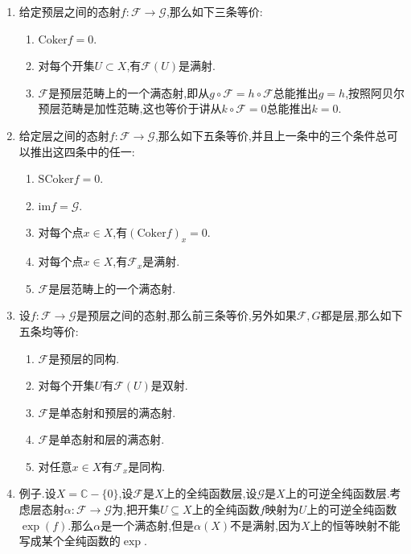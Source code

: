 \begin{enumerate}
\begin{enumerate}[(a)]
\begin{enumerate}[(1)]
\begin{proof}
				对可分预层$\mathscr{F}$验证(d)推(b):假设$s\in \mathscr{F}(U)$满足$\mathscr{F}(U)(s)=0\in\mathscr{G}(U)$.那么对每个$x\in U$有$\mathscr{F}_x(s_x)=(\mathscr{F}(U)(s))_x=0$,按照条件$\mathscr{F}_x$是单射,得到$s_x=0,\forall x\in U$,于是唯一性公理得到$s=0$.
			\end{proof}
			\item 给定预层之间的态射$f:\mathscr{F}\to\mathscr{G}$,那么如下三条等价:
			\begin{enumerate}[(1)]
				\item $\mathrm{Coker}f=0$.
				\item 对每个开集$U\subset X$,有$\mathscr{F}(U)$是满射.
				\item $\mathscr{F}$是预层范畴上的一个满态射,即从$g\circ \mathscr{F}=h\circ \mathscr{F}$总能推出$g=h$,按照阿贝尔预层范畴是加性范畴,这也等价于讲从$k\circ \mathscr{F}=0$总能推出$k=0$.
			\end{enumerate}
			\item 给定层之间的态射$f:\mathscr{F}\to\mathscr{G}$,那么如下五条等价,并且上一条中的三个条件总可以推出这四条中的任一:
			\begin{enumerate}[(1)]
				\item $\mathrm{SCoker}f=0$.
				\item $\mathrm{im}f=\mathscr{G}$.
				\item 对每个点$x\in X$,有$(\mathrm{Coker}f)_x=0$.
				\item 对每个点$x\in X$,有$\mathscr{F}_x$是满射.
				\item $\mathscr{F}$是层范畴上的一个满态射.
			\end{enumerate} 
			\item 设$f:\mathscr{F}\to\mathscr{G}$是预层之间的态射,那么前三条等价,另外如果$\mathscr{F},G$都是层,那么如下五条均等价:
			\begin{enumerate}[(1)]
				\item $\mathscr{F}$是预层的同构.
				\item 对每个开集$U$有$\mathscr{F}(U)$是双射.
				\item $\mathscr{F}$是单态射和预层的满态射.
				\item $\mathscr{F}$是单态射和层的满态射.
				\item 对任意$x\in X$有$\mathscr{F}_x$是同构.
			\end{enumerate}
			\item 例子.设$X=\mathbb{C}-\{0\}$,设$\mathscr{F}$是$X$上的全纯函数层,设$\mathscr{G}$是$X$上的可逆全纯函数层.考虑层态射$\alpha:\mathscr{F}\to\mathscr{G}$为,把开集$U\subseteq X$上的全纯函数$f$映射为$U$上的可逆全纯函数$\exp(f)$.那么$\alpha$是一个满态射,但是$\alpha(X)$不是满射,因为$X$上的恒等映射不能写成某个全纯函数的$\exp$.

\end{enumerate}
\end{enumerate}
\end{enumerate}
